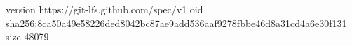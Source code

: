 version https://git-lfs.github.com/spec/v1
oid sha256:8ca50a49e58226ded8042bc87ae9add536aaf9278fbbe46d8a31cd4a6e30f131
size 48079
